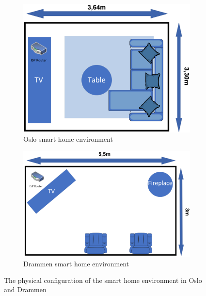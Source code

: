 \begin{figure}[H]
    \centering
    \begin{subfigure}[b]{0.60\textwidth}
        \includegraphics[width=\textwidth]{figures/Environment1.png}
        \caption{Oslo smart home environment}
        \label{fig:Environment1}
    \end{subfigure}
    \hfill
    \begin{subfigure}[b]{0.75\textwidth}
        \includegraphics[width=\textwidth]{figures/Environment2.png}
        \caption{Drammen smart home environment}
        \label{fig:Environmet2}
    \end{subfigure}
    \caption{The physical configuration of the smart home environment in Oslo and Drammen}
    \label{fig:SmartHomeEnvironments}
\end{figure}

